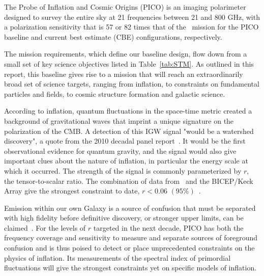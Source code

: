 \documentclass[PICOReport.tex]{subfiles}
\begin{document}

 
The Probe of Inflation and Cosmic Origins (PICO) is an imaging polarimeter designed to survey the entire sky at 21 frequencies between 21 and 800 GHz, with a polarization sensitivity that is 57 or 82 times that of the \planck\ mission for the PICO baseline and current best estimate (\ac{CBE}) configurations, respectively. 

The mission requirements, which define our baseline design, flow down from a small set of key science objectives listed in Table~\ref{tab:STM}. As outlined in this report, this baseline gives rise to a mission that will reach an extraordinarily broad set of science targets, ranging from inflation, to constraints on fundamental particles and fields, to cosmic structure formation and galactic science.

According to inflation, quantum fluctuations in the space-time metric created a background of gravitational waves that imprint a unique signature on the polarization of the CMB. A detection of this \ac{IGW} signal "would be a watershed discovery", a quote from the 2010 decadal panel report~\citep{blandford2010}. It would be the first observational evidence for quantum gravity, and the signal would also give important clues about the nature of inflation, in particular the energy scale at which it occurred. The strength of the signal is commonly parameterized by $r$, the tensor-to-scalar ratio. The combination of data from \planck\ and the BICEP/Keck Array give the strongest constraint to date, $r<0.06\,\, (95\%)$~\citep{2018arXiv181005216A}.

Emission within our own Galaxy is a source of confusion that must be separated with high fidelity before definitive discovery, or stronger upper limits, can be claimed~\citep{2016A&A...586A.133P}. For the levels of $r$ targeted in the next decade, PICO has both the frequency coverage and sensitivity to measure and separate sources of foreground confusion and is thus poised to detect or place unprecedented constraints on the physics of inflation. Its measurements of the spectral index of primordial fluctuations will give the strongest constraints yet on specific models of inflation. 

\end{document}
